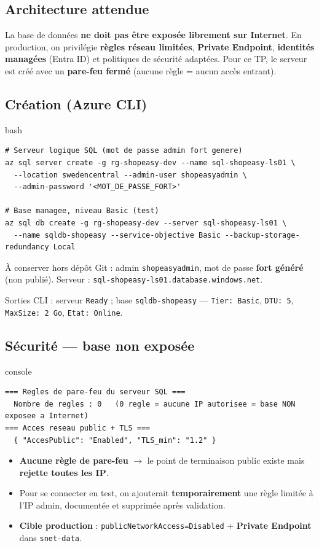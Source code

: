 \documentclass[11pt,a4paper]{article}
\newcommand{\arr}{\ensuremath{\rightarrow}}
\newcommand{\code}[1]{\texttt{#1}}
\begin{document}
\subsection{Architecture attendue}
La base de données \textbf{ne doit pas être exposée librement sur Internet}. En production, on privilégie
\textbf{règles réseau limitées}, \textbf{Private Endpoint}, \textbf{identités managées} (Entra ID) et
politiques de sécurité adaptées. Pour ce TP, le serveur est créé avec un \textbf{pare-feu fermé} (aucune règle
= aucun accès entrant).

\subsection{Création (Azure CLI)}
\begin{codebox}{bash}
\begin{Verbatim}
# Serveur logique SQL (mot de passe admin fort genere)
az sql server create -g rg-shopeasy-dev --name sql-shopeasy-ls01 \
  --location swedencentral --admin-user shopeasyadmin \
  --admin-password '<MOT_DE_PASSE_FORT>'

# Base managee, niveau Basic (test)
az sql db create -g rg-shopeasy-dev --server sql-shopeasy-ls01 \
  --name sqldb-shopeasy --service-objective Basic --backup-storage-redundancy Local
\end{Verbatim}
\end{codebox}
\begin{notebox}[Identifiants]
À conserver hors dépôt Git : admin \code{shopeasyadmin}, mot de passe \textbf{fort généré} (non publié).
Serveur : \code{sql-shopeasy-ls01.database.windows.net}.
\end{notebox}

{\small Sorties CLI : serveur \code{Ready} ; base \code{sqldb-shopeasy} — \code{Tier: Basic}, \code{DTU: 5}, \code{MaxSize: 2 Go}, \code{Etat: Online}.}

\subsection{Sécurité — base non exposée}
\begin{codebox}{console}
\begin{Verbatim}
=== Regles de pare-feu du serveur SQL ===
  Nombre de regles : 0   (0 regle = aucune IP autorisee = base NON exposee a Internet)
=== Acces reseau public + TLS ===
  { "AccesPublic": "Enabled", "TLS_min": "1.2" }
\end{Verbatim}
\end{codebox}
\begin{itemize}
  \item \textbf{Aucune règle de pare-feu} \arr{} le point de terminaison public existe mais \textbf{rejette toutes les IP}.
  \item Pour se connecter en test, on ajouterait \textbf{temporairement} une règle limitée à l'IP admin, documentée et supprimée après validation.
  \item \textbf{Cible production} : \code{publicNetworkAccess=Disabled} + \textbf{Private Endpoint} dans \code{snet-data}.
\end{itemize}
\end{document}

